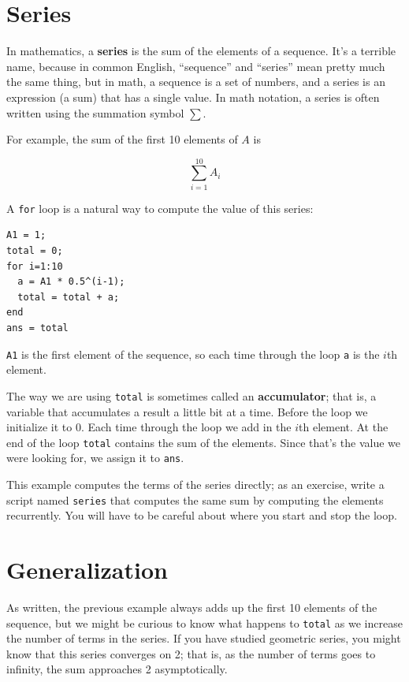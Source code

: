\documentclass{book}
\begin{document}
\section{Series}
\label{series}

In mathematics, a {\bf series} is the sum of the elements of
a sequence. It's a terrible name, because in common English,
``sequence'' and ``series'' mean pretty much the same thing, but in
math, a sequence is a set of numbers, and a series is an expression
(a sum) that has a single value. In math notation, a series
is often written using the summation symbol $\sum$.

For example, the sum of the first 10 elements of $A$ is

\[ \sum_{i=1}^{10} A_i \]

A {\tt for} loop is a natural way to compute the value of this
series:

\begin{verbatim}
A1 = 1;
total = 0;
for i=1:10
  a = A1 * 0.5^(i-1);
  total = total + a;
end
ans = total
\end{verbatim}

{\tt A1} is the first element of the sequence, so each time
through the loop {\tt a} is the $i$th element. 

The way we are using {\tt total} is sometimes called an {\bf
accumulator}; that is, a variable that accumulates a result a little
bit at a time. Before the loop we initialize it to 0. Each time
through the loop we add in the $i$th element. At the end of the loop
{\tt total} contains the sum of the elements. Since that's the value
we were looking for, we assign it to {\tt ans}.

\begin{ex}
This example computes the terms of the series directly; as
an exercise, write a script named {\tt series} that computes
the same sum by computing the elements recurrently. You will
have to be careful about where you start and stop the loop.
\end{ex}


\section{Generalization}

As written, the previous example always adds up the first 10
elements of the sequence, but we might be curious to know what
happens to {\tt total} as we increase the
number of terms in the series. If you have studied geometric
series, you might know that this series converges on 2; that is,
as the number of terms goes to infinity, the sum approaches
2 asymptotically.
\end{document}
